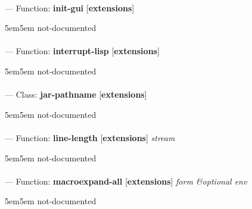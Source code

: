 \paragraph{}
\label{EXTENSIONS:INIT-GUI}
--- Function: \textbf{init-gui} [\textbf{extensions}] \textit{}

\begin{adjustwidth}{5em}{5em}
not-documented
\end{adjustwidth}

\paragraph{}
\label{EXTENSIONS:INTERRUPT-LISP}
--- Function: \textbf{interrupt-lisp} [\textbf{extensions}] \textit{}

\begin{adjustwidth}{5em}{5em}
not-documented
\end{adjustwidth}

\paragraph{}
\label{EXTENSIONS:JAR-PATHNAME}
--- Class: \textbf{jar-pathname} [\textbf{extensions}] \textit{}

\begin{adjustwidth}{5em}{5em}
not-documented
\end{adjustwidth}

\paragraph{}
\label{EXTENSIONS:LINE-LENGTH}
--- Function: \textbf{line-length} [\textbf{extensions}] \textit{stream}

\begin{adjustwidth}{5em}{5em}
not-documented
\end{adjustwidth}

\paragraph{}
\label{EXTENSIONS:MACROEXPAND-ALL}
--- Function: \textbf{macroexpand-all} [\textbf{extensions}] \textit{form \&optional env}

\begin{adjustwidth}{5em}{5em}
not-documented
\end{adjustwidth}

